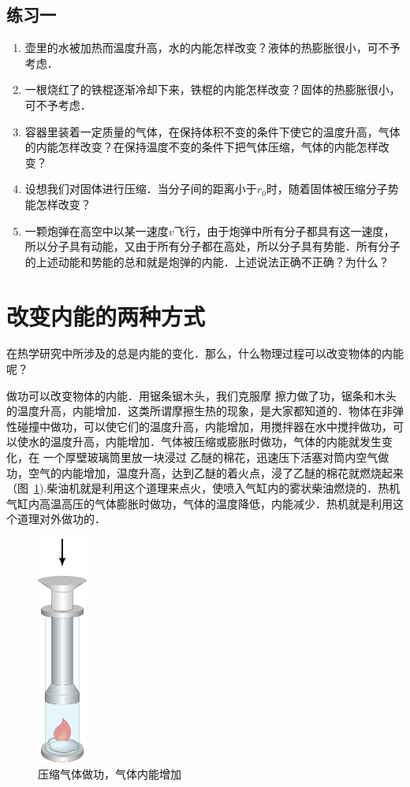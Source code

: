 \subsection*{练习一}
\begin{enumerate}
\item 壶里的水被加热而温度升高，水的内能怎样改变？液体的热膨胀很小，可不予考虑．
\item 一根烧红了的铁棍逐渐冷却下来，铁棍的内能怎样改变？固体的热膨胀很小，可不予考虑．
\item 容器里装着一定质量的气体，在保持体积不变的条件下使它的温度升高，气体的内能怎样改变？在保持温度不变的条件下把气体压缩，气体的内能怎样改变？
\item 设想我们对固体进行压缩．当分子间的距离小于$r_0$时，随着固体被压缩分子势能怎样改变？
\item 一颗炮弹在高空中以某一速度$v$飞行，由于炮弹中所有分子都具有这一速度，所以分子具有动能，又由于所有分子都在高处，所以分子具有势能．所有分子的上述动能和势能的总和就是炮弹的内能．上述说法正确不正确？为什么？
\end{enumerate}

\section{改变内能的两种方式}
在热学研究中所涉及的总是内能的变化．那么，什么物理过程可以改变物体的内能呢？

做功可以改变物体的内能．用锯条锯木头，我们克服摩
擦力做了功，锯条和木头的温度升高，内能增加．这类所谓摩擦生热的现象，是大家都知道的．物体在非弹性碰撞中做功，可以使它们的温度升高，内能增加，用搅拌器在水中搅拌做功，可以使水的温度升高，内能增加．气体被压缩或膨胀时做功，气体的内能就发生变化，在
一个厚壁玻璃筒里放一块浸过
乙醚的棉花，迅速压下活塞对筒内空气做功，空气的内能增加，温度升高，达到乙醚的着火点，浸了乙醚的棉花就燃烧起来（图~\ref{fig_B_2-1}).柴油机就是利用这个道理来点火，使喷入气缸内的雾状柴油燃烧的．热机气缸内高温高压的气体膨胀时做功，气体的温度降低，内能减少．热机就是利用这个道理对外做功的．

\begin{figure}[htbp]
    \centering
    \includegraphics{fig/B/2-1.pdf}
    \caption{压缩气体做功，气体内能增加}\label{fig_B_2-1}
\end{figure}

